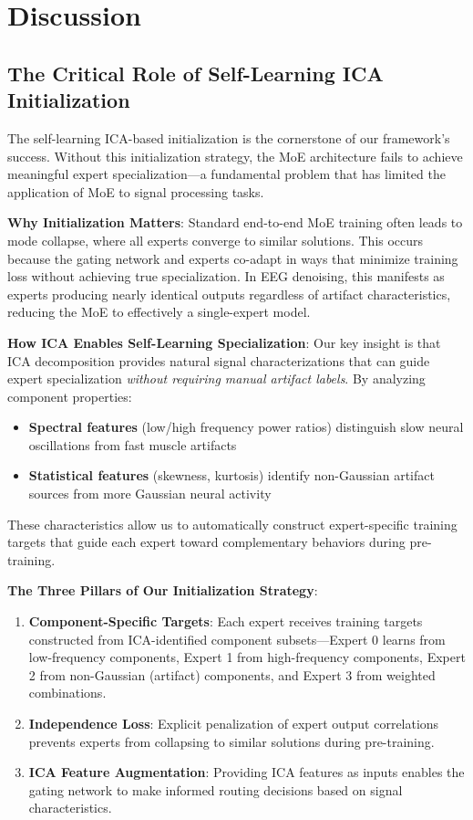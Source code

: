 \documentclass[journal]{IEEEtran}
\begin{document}
\section{Discussion}
\label{sec:discussion}

\subsection{The Critical Role of Self-Learning ICA Initialization}

The self-learning ICA-based initialization is the cornerstone of our framework's success. Without this initialization strategy, the MoE architecture fails to achieve meaningful expert specialization---a fundamental problem that has limited the application of MoE to signal processing tasks.

\textbf{Why Initialization Matters}: Standard end-to-end MoE training often leads to mode collapse, where all experts converge to similar solutions. This occurs because the gating network and experts co-adapt in ways that minimize training loss without achieving true specialization. In EEG denoising, this manifests as experts producing nearly identical outputs regardless of artifact characteristics, reducing the MoE to effectively a single-expert model.

\textbf{How ICA Enables Self-Learning Specialization}: Our key insight is that ICA decomposition provides natural signal characterizations that can guide expert specialization \textit{without requiring manual artifact labels}. By analyzing component properties:
\begin{itemize}
\item \textbf{Spectral features} (low/high frequency power ratios) distinguish slow neural oscillations from fast muscle artifacts
\item \textbf{Statistical features} (skewness, kurtosis) identify non-Gaussian artifact sources from more Gaussian neural activity
\end{itemize}

These characteristics allow us to automatically construct expert-specific training targets that guide each expert toward complementary behaviors during pre-training.

\textbf{The Three Pillars of Our Initialization Strategy}:
\begin{enumerate}
\item \textbf{Component-Specific Targets}: Each expert receives training targets constructed from ICA-identified component subsets---Expert 0 learns from low-frequency components, Expert 1 from high-frequency components, Expert 2 from non-Gaussian (artifact) components, and Expert 3 from weighted combinations.
\item \textbf{Independence Loss}: Explicit penalization of expert output correlations prevents experts from collapsing to similar solutions during pre-training.
\item \textbf{ICA Feature Augmentation}: Providing ICA features as inputs enables the gating network to make informed routing decisions based on signal characteristics.
\end{enumerate}
\end{document}
